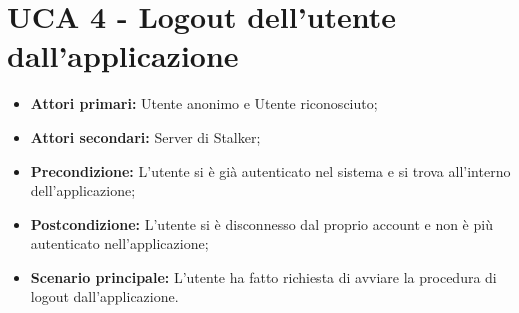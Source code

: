 \section{UCA 4 - Logout dell'utente dall'applicazione}%
\begin{itemize}
\item \textbf{Attori primari:} Utente anonimo e Utente riconosciuto;
\item \textbf{Attori secondari:} Server di Stalker;
\item \textbf{Precondizione:} L’utente si è già autenticato nel sistema e si trova all’interno dell’applicazione;
\item \textbf{Postcondizione:}  L’utente si è disconnesso dal proprio account e non è più autenticato nell’applicazione;
\item \textbf{Scenario principale:} L'utente ha fatto richiesta di avviare la procedura di logout dall'applicazione.
\end{itemize}
